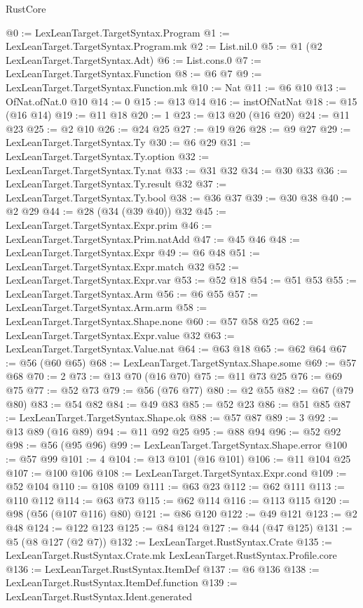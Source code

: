 \begin{lexlean}{RustCore}
\begin{coremodule}
@0 := LexLeanTarget.TargetSyntax.Program
@1 := LexLeanTarget.TargetSyntax.Program.mk
@2 := List.nil.{0}
@5 := @1 (@2 LexLeanTarget.TargetSyntax.Adt)
@6 := List.cons.{0}
@7 := LexLeanTarget.TargetSyntax.Function
@8 := @6 @7
@9 := LexLeanTarget.TargetSyntax.Function.mk
@10 := Nat
@11 := @6 @10
@13 := OfNat.ofNat.{0} @10
@14 := 0
@15 := @13 @14
@16 := instOfNatNat
@18 := @15 (@16 @14)
@19 := @11 @18
@20 := 1
@23 := @13 @20 (@16 @20)
@24 := @11 @23
@25 := @2 @10
@26 := @24 @25
@27 := @19 @26
@28 := @9 @27
@29 := LexLeanTarget.TargetSyntax.Ty
@30 := @6 @29
@31 := LexLeanTarget.TargetSyntax.Ty.option
@32 := LexLeanTarget.TargetSyntax.Ty.nat
@33 := @31 @32
@34 := @30 @33
@36 := LexLeanTarget.TargetSyntax.Ty.result @32
@37 := LexLeanTarget.TargetSyntax.Ty.bool
@38 := @36 @37
@39 := @30 @38
@40 := @2 @29
@44 := @28 (@34 (@39 @40)) @32
@45 := LexLeanTarget.TargetSyntax.Expr.prim
@46 := LexLeanTarget.TargetSyntax.Prim.natAdd
@47 := @45 @46
@48 := LexLeanTarget.TargetSyntax.Expr
@49 := @6 @48
@51 := LexLeanTarget.TargetSyntax.Expr.match @32
@52 := LexLeanTarget.TargetSyntax.Expr.var
@53 := @52 @18
@54 := @51 @53
@55 := LexLeanTarget.TargetSyntax.Arm
@56 := @6 @55
@57 := LexLeanTarget.TargetSyntax.Arm.arm
@58 := LexLeanTarget.TargetSyntax.Shape.none
@60 := @57 @58 @25
@62 := LexLeanTarget.TargetSyntax.Expr.value @32
@63 := LexLeanTarget.TargetSyntax.Value.nat
@64 := @63 @18
@65 := @62 @64
@67 := @56 (@60 @65)
@68 := LexLeanTarget.TargetSyntax.Shape.some
@69 := @57 @68
@70 := 2
@73 := @13 @70 (@16 @70)
@75 := @11 @73 @25
@76 := @69 @75
@77 := @52 @73
@79 := @56 (@76 @77)
@80 := @2 @55
@82 := @67 (@79 @80)
@83 := @54 @82
@84 := @49 @83
@85 := @52 @23
@86 := @51 @85
@87 := LexLeanTarget.TargetSyntax.Shape.ok
@88 := @57 @87
@89 := 3
@92 := @13 @89 (@16 @89)
@94 := @11 @92 @25
@95 := @88 @94
@96 := @52 @92
@98 := @56 (@95 @96)
@99 := LexLeanTarget.TargetSyntax.Shape.error
@100 := @57 @99
@101 := 4
@104 := @13 @101 (@16 @101)
@106 := @11 @104 @25
@107 := @100 @106
@108 := LexLeanTarget.TargetSyntax.Expr.cond
@109 := @52 @104
@110 := @108 @109
@111 := @63 @23
@112 := @62 @111
@113 := @110 @112
@114 := @63 @73
@115 := @62 @114
@116 := @113 @115
@120 := @98 (@56 (@107 @116) @80)
@121 := @86 @120
@122 := @49 @121
@123 := @2 @48
@124 := @122 @123
@125 := @84 @124
@127 := @44 (@47 @125)
@131 := @5 (@8 @127 (@2 @7))
@132 := LexLeanTarget.RustSyntax.Crate
@135 := LexLeanTarget.RustSyntax.Crate.mk LexLeanTarget.RustSyntax.Profile.core
@136 := LexLeanTarget.RustSyntax.ItemDef
@137 := @6 @136
@138 := LexLeanTarget.RustSyntax.ItemDef.function
@139 := LexLeanTarget.RustSyntax.Ident.generated

\end{coremodule}
\end{lexlean}
